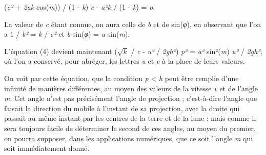 \documentclass[a4paper, 11pt, oneside, polutonikogreek, french]{article}
\begin{document}
\begin{center}
(\emph{c²} + \emph{2ak} cos(\emph{m})) / (1 - \emph{k}) \emph{c} - \emph{a²k} / (1 - \emph{k}) = \emph{o}.
\end{center}

La valeur de \emph{c} étant connue, on aura celle de \emph{b} et de sin(\emph{φ}), en observant que l'on a 1 / \emph{b²} = \emph{k} / \emph{c²} et \emph{b} sin(\emph{φ}) = \emph{a} sin(\emph{m}).

L'équation (4) devient maintenant ($\sqrt{k}$ / \emph{c} - \emph{u²} / \emph{2gh²}) \emph{p²} = \emph{a²} sin²(\emph{m}) \emph{u²} / \emph{2gh²}, où l'on a conservé, pour abréger, les lettres \emph{u} et \emph{c} à la place de leurs valeurs.

On voit par cette équation, que la condition \emph{p} < \emph{h} peut être remplie d'une infinité de manières différentes, au moyen des valeurs de la vitesse \emph{v} et de l'angle \emph{m}. Cet angle n'est pas précisément l'angle de projection ; c'est-à-dire l'angle que faisait la direction du mobile à l'instant de sa projection, avec la droite qui passait au même instant par les centres de la terre et de la lune ; mais comme il sera toujours facile de déterminer le second de ces angles, au moyen du premier, on pourra supposer, dans les applications numériques, que ce soit l'angle \emph{m} qui soit immédiatement donné.
\end{document}
